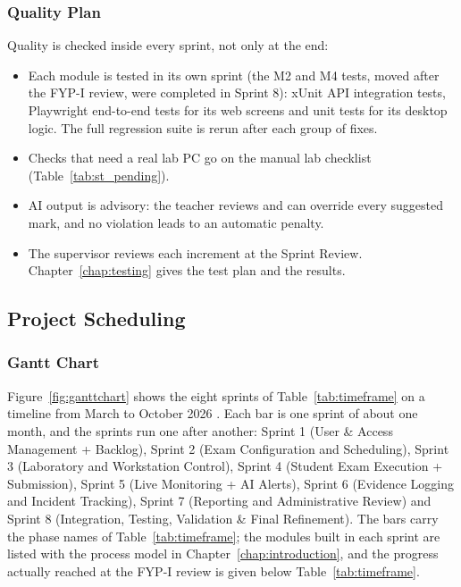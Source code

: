 \filbreak
\subsubsection{Quality Plan}

Quality is checked inside every sprint, not only at the end:
\begin{itemize}[nosep]
    \item Each module is tested in its own sprint (the M2 and M4 tests, moved after the FYP-I review, were completed in Sprint 8): xUnit API integration tests, Playwright end-to-end tests for its web screens and unit tests for its desktop logic. The full regression suite is rerun after each group of fixes.
    \item Checks that need a real lab PC go on the manual lab checklist (Table~\ref{tab:st_pending}).
    \item AI output is advisory: the teacher reviews and can override every suggested mark, and no violation leads to an automatic penalty.
    \item The supervisor reviews each increment at the Sprint Review. Chapter~\ref{chap:testing} gives the test plan and the results.
\end{itemize}

\subsection{Project Scheduling}
\label{sec:scheduling}

\subsubsection{Gantt Chart}

Figure~\ref{fig:ganttchart} shows the eight sprints of Table~\ref{tab:timeframe} on a timeline from March to October 2026 \cite{gantt1}. Each bar is one sprint of about one month, and the sprints run one after another: Sprint 1 (User \& Access Management + Backlog), Sprint 2 (Exam Configuration and Scheduling), Sprint 3 (Laboratory and Workstation Control), Sprint 4 (Student Exam Execution + Submission), Sprint 5 (Live Monitoring + AI Alerts), Sprint 6 (Evidence Logging and Incident Tracking), Sprint 7 (Reporting and Administrative Review) and Sprint 8 (Integration, Testing, Validation \& Final Refinement). The bars carry the phase names of Table~\ref{tab:timeframe}; the modules built in each sprint are listed with the process model in Chapter~\ref{chap:introduction}, and the progress actually reached at the FYP-I review is given below Table~\ref{tab:timeframe}.

